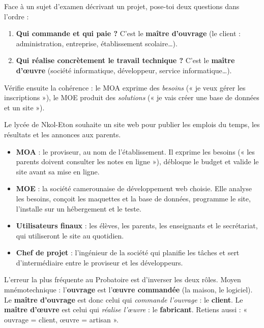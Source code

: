 \documentclass[11pt]{article}
\begin{document}
\begin{methode}
Face à un sujet d'examen décrivant un projet, pose-toi deux questions dans l'ordre :
\begin{enumerate}
\item \textbf{Qui commande et qui paie ?} C'est le \textbf{maître d'ouvrage} (le client : administration, entreprise, établissement scolaire\ldots).
\item \textbf{Qui réalise concrètement le travail technique ?} C'est le \textbf{maître d'œuvre} (société informatique, développeur, service informatique\ldots).
\end{enumerate}
Vérifie ensuite la cohérence : le MOA exprime des \emph{besoins} (« je veux gérer les inscriptions »), le MOE produit des \emph{solutions} (« je vais créer une base de données et un site »).
\end{methode}

\begin{exemplebox}
Le lycée de Nkol-Eton souhaite un site web pour publier les emplois du temps, les résultats et les annonces aux parents.
\begin{itemize}
\item \textbf{MOA} : le proviseur, au nom de l'établissement. Il exprime les besoins (« les parents doivent consulter les notes en ligne »), débloque le budget et valide le site avant sa mise en ligne.
\item \textbf{MOE} : la société camerounaise de développement web choisie. Elle analyse les besoins, conçoit les maquettes et la base de données, programme le site, l'installe sur un hébergement et le teste.
\item \textbf{Utilisateurs finaux} : les élèves, les parents, les enseignants et le secrétariat, qui utiliseront le site au quotidien.
\item \textbf{Chef de projet} : l'ingénieur de la société qui planifie les tâches et sert d'intermédiaire entre le proviseur et les développeurs.
\end{itemize}
\end{exemplebox}

\begin{attention}
L'erreur la plus fréquente au Probatoire est d'inverser les deux rôles. Moyen mnémotechnique : l'\textbf{ouvrage} est l'\textbf{œuvre commandée} (la maison, le logiciel). Le \textbf{maître d'ouvrage} est donc celui qui \emph{commande l'ouvrage} : le \textbf{client}. Le \textbf{maître d'œuvre} est celui qui \emph{réalise l'œuvre} : le \textbf{fabricant}. Retiens aussi : « ouvrage = client, œuvre = artisan ».
\end{attention}
\end{document}
